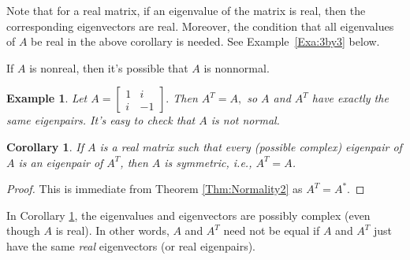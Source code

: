 \documentclass{article}
\newtheorem{exa}{Example}
\newtheorem{corollary}{Corollary}
\begin{document}
Note that for a real matrix, if an eigenvalue of the matrix is real, then the corresponding eigenvectors are real. Moreover, the condition that all eigenvalues of $A$  be real in the above corollary is needed. See Example~\ref{Exa:3by3} below.
\medskip


If $A$ is nonreal, then it's possible that $A$ is nonnormal.

\begin{exa}\rm
Let $
A=
\begin{bmatrix}
1 & i\\
i & -1
\end{bmatrix}.
$
Then
$
A^T=A,
$
so $A$  and $A^T$ have exactly the same eigenpairs.
It's easy to check that $A$ is not normal.
\end{exa}


\begin{corollary}\label{Cor:4}
\rm If $A$ is a real matrix such that
every (possible complex) eigenpair    of $A$
 is an eigenpair of $A^T$,  then $A$ is symmetric, i.e., $A^T=A$.
\end{corollary}

\begin{proof} This is immediate from Theorem \ref{Thm:Normality2} as $A^T=A^*$. \end{proof}

In   Corollary \ref{Cor:4}, the eigenvalues and eigenvectors are possibly complex (even though $A$ is real). In other words,
$A$ and $A^T$ need not be equal if $A$ and $A^T$ just have  the same {\em real} eigenvectors (or real eigenpairs).
\end{document}

